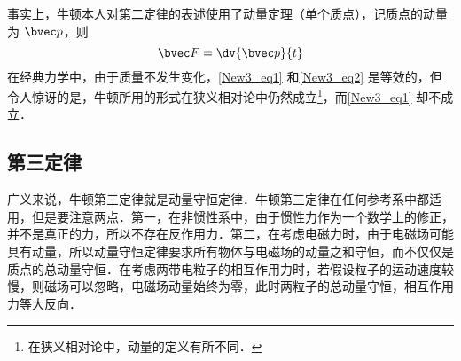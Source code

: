 事实上，牛顿本人对第二定律的表述使用了动量定理（单个质点），记质点的动量为 $\bvec p$，则
\begin{equation}\label{New3_eq2}
\bvec F = \dv{\bvec p}{t}
\end{equation}
在经典力学中，由于质量不发生变化，\autoref{New3_eq1} 和\autoref{New3_eq2} 是等效的，但令人惊讶的是，牛顿所用的形式在狭义相对论中仍然成立\footnote{在狭义相对论中，动量的定义有所不同．}，而\autoref{New3_eq1} 却不成立．

\subsection{第三定律}
广义来说，牛顿第三定律就是动量守恒定律．牛顿第三定律在任何参考系中都适用，但是要注意两点．第一，在非惯性系中，由于惯性力作为一个数学上的修正，并不是真正的力，所以不存在反作用力．第二，在考虑电磁力时，由于电磁场可能具有动量，所以动量守恒定律要求所有物体与电磁场的动量之和守恒，而不仅仅是质点的总动量守恒．在考虑两带电粒子的相互作用力时，若假设粒子的运动速度较慢，则磁场可以忽略，电磁场动量始终为零，此时两粒子的总动量守恒，相互作用力等大反向．
